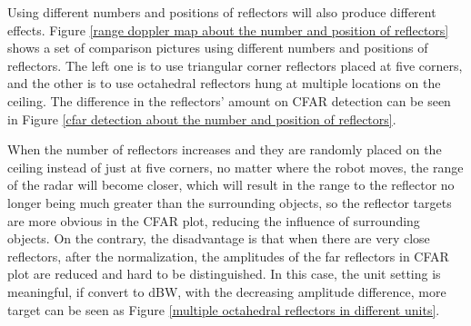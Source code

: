 \documentclass[12pt,DIV14,BCOR12mm,a4paper,footinclude=false,headinclude,parskip=half-,twoside,openright,cleardoublepage=empty,toc=index,bibliography=totoc,listof=totoc]{scrreprt}
\numberwithin{equation}{chapter}
\begin{document}
Using different numbers and positions of reflectors will also produce different effects. Figure \ref{range doppler map about the number and position of reflectors} shows a set of comparison pictures using different numbers and positions \cite{hinderer_indoor_2023} of reflectors. The left one is to use triangular corner reflectors placed at five corners, and the other is to use octahedral reflectors hung at multiple locations on the ceiling. The difference in the reflectors' amount on CFAR detection can be seen in Figure \ref{cfar detection about the number and position of reflectors}.

When the number of reflectors increases and they are randomly placed on the ceiling instead of just at five corners, no matter where the robot moves, the range of the radar will become closer, which will result in the range to the reflector no longer being much greater than the surrounding objects, so the reflector targets are more obvious in the CFAR plot, reducing the influence of surrounding objects. On the contrary, the disadvantage is that when there are very close reflectors, after the normalization, the amplitudes of the far reflectors in CFAR plot are reduced and hard to be distinguished. In this case, the unit setting is meaningful, if convert to dBW, with the decreasing amplitude difference, more target can be seen as Figure \ref{multiple octahedral reflectors in different units}.
\end{document}
